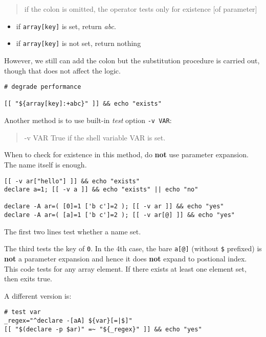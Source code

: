\begin{quotation}
  if the colon is omitted, the operator tests only for existence [of parameter] 
\end{quotation}

\begin{itemize}
\item if \lstinline|array[key]| is set, return \textit{abc}.
\item if \lstinline|array[key]| is not set, return nothing
\end{itemize}

However, we still can add the colon but the substitution procedure
is carried out, though that does not affect the logic.

\begin{lstlisting}
# degrade performance

[[ "${array[key]:+abc}" ]] && echo "exists"
\end{lstlisting}

Another method is to use built-in \textit{test} option
\verb|-v VAR|:

\begin{quotation}
  -v VAR         True if the shell variable VAR is set.
\end{quotation}

When to check for existence in this method, do \textbf{not} use
parameter expansion. The name itself is enough.

\begin{lstlisting}
[[ -v ar["hello"] ]] && echo "exists"
declare a=1; [[ -v a ]] && echo "exists" || echo "no"

declare -A ar=( [0]=1 ['b c']=2 ); [[ -v ar ]] && echo "yes"
declare -A ar=( [a]=1 ['b c']=2 ); [[ -v ar[@] ]] && echo "yes"
\end{lstlisting}

The first two lines test whether a name set.

The third tests the key of \verb|0|. In the 4th case, the bare
\verb|a[@]| (without
\verb|$| prefixed) is \textbf{not} a parameter expansion and hence
it does \textbf{not} expand to postional index. This code tests
for any array element. If there exists at least one element set,
then exits true.

A different version is:

\begin{lstlisting}
# test var
_regex="^declare -[aA] ${var}[=|$]"
[[ "$(declare -p $ar)" =~ "${_regex}" ]] && echo "yes"
\end{lstlisting}

